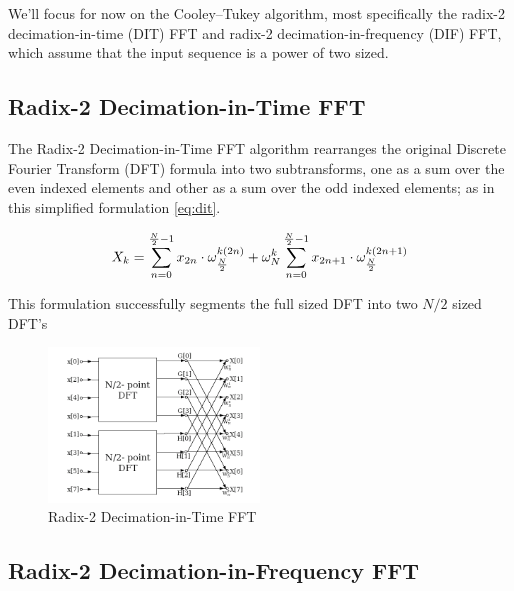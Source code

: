 \documentclass[
  oneside,
  11pt, a4paper,
  footinclude=true,
  headinclude=true,
  cleardoublepage=empty
]{scrbook}
\begin{document}
We'll focus for now on the Cooley–Tukey algorithm, most specifically the radix-2 decimation-in-time (DIT) FFT and radix-2 decimation-in-frequency (DIF) FFT, which assume that the input sequence is a power of two sized.


\subsection{Radix-2 Decimation-in-Time FFT} \label{subsec:radix-2-decimation-in-time-fft}


The Radix-2 Decimation-in-Time FFT algorithm rearranges the original Discrete Fourier Transform (DFT) formula into two subtransforms, one as a sum over the even indexed elements and other as a sum over the odd indexed elements; as in this simplified formulation \autoref{eq:dit}.

\begin{equation} \label{eq:dit}
    X_{k} = \sum_{n=0}^{\frac{N}{2}-1}x_{2n} \cdot \omega_{\frac{N}{2}}^{k(2n)} + \omega_{N}^{k} \sum_{n=0}^{\frac{N}{2}-1}x_{2n+1} \cdot \omega_{\frac{N}{2}}^{k(2n+1)} \\
\end{equation}

This formulation successfully segments the full sized DFT into two \(N/2\) sized DFT's

\cite{jones2014digital}

\begin{figure}[h] 
    \label{fig:dit-fft}
    \centering
    \includegraphics[width=0.5\textwidth]{imgs/dit_fft.png}
    \caption{Radix-2 Decimation-in-Time FFT}
\end{figure}


\subsection{Radix-2 Decimation-in-Frequency FFT} \label{subsec:radix-2-decimation-in-frequency-fft}
\end{document}
